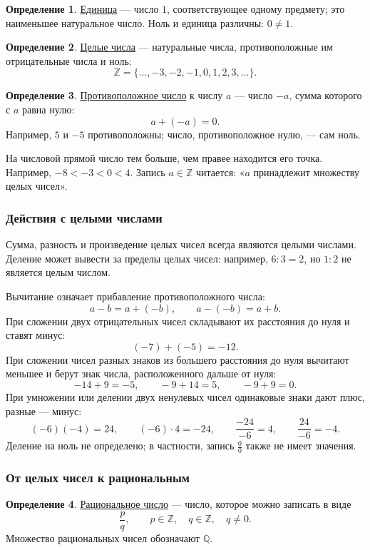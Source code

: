 \documentclass[12pt,a4paper]{article}
\theoremstyle{definition}
\newtheorem{definition}{Определение}[section]
\theoremstyle{plain}
\theoremstyle{remark}
\newcommand{\term}[1]{\uline{#1}}
\begin{document}
\begin{definition}
\term{Единица} --- число \(1\), соответствующее одному предмету; это наименьшее натуральное число.
Ноль и единица различны: \(0\ne1\).
\end{definition}

\begin{definition}
\term{Целые числа} --- натуральные числа, противоположные им отрицательные числа и ноль:
\[
\mathbb Z=\{\ldots,-3,-2,-1,0,1,2,3,\ldots\}.
\]
\end{definition}

\begin{definition}
\term{Противоположное число} к числу \(a\) --- число \(-a\), сумма которого с \(a\) равна нулю:
\[
a+(-a)=0.
\]
Например, \(5\) и \(-5\) противоположны; число, противоположное нулю, --- сам ноль.
\end{definition}

На числовой прямой число тем больше, чем правее находится его точка.
Например, \(-8<-3<0<4\).
Запись \(a\in\mathbb Z\) читается: «\(a\) принадлежит множеству целых чисел».

\subsubsection*{Действия с целыми числами}

Сумма, разность и произведение целых чисел всегда являются целыми числами.
Деление может вывести за пределы целых чисел: например, \(6:3=2\), но \(1:2\) не является целым числом.

Вычитание означает прибавление противоположного числа:
\[
a-b=a+(-b),\qquad a-(-b)=a+b.
\]
При сложении двух отрицательных чисел складывают их расстояния до нуля и ставят минус:
\[
(-7)+(-5)=-12.
\]
При сложении чисел разных знаков из большего расстояния до нуля вычитают меньшее
и берут знак числа, расположенного дальше от нуля:
\[
-14+9=-5,\qquad -9+14=5,\qquad -9+9=0.
\]
При умножении или делении двух ненулевых чисел одинаковые знаки дают плюс, разные --- минус:
\[
(-6)(-4)=24,\qquad (-6)\cdot4=-24,\qquad
\frac{-24}{-6}=4,\qquad \frac{24}{-6}=-4.
\]
Деление на ноль не определено; в частности, запись \(\frac{0}{0}\) также не имеет значения.

\subsubsection*{От целых чисел к рациональным}

\begin{definition}
\term{Рациональное число} --- число, которое можно записать в виде
\[
\frac pq,\qquad p\in\mathbb Z,\quad q\in\mathbb Z,\quad q\ne0.
\]
Множество рациональных чисел обозначают \(\mathbb Q\).
\end{definition}
\end{document}
